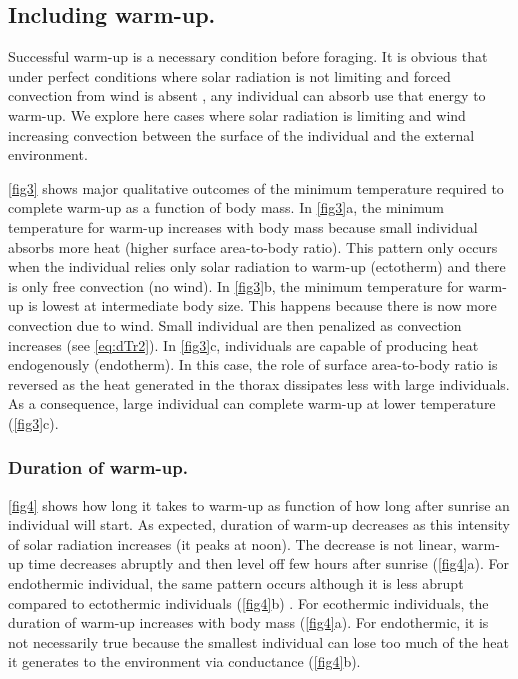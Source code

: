 \subsection*{Including warm-up.}
Successful warm-up is a necessary condition before foraging. 
It is obvious that under perfect conditions where solar radiation is not limiting and forced convection from wind is absent , any individual can absorb use that energy to warm-up.
We explore here cases where solar radiation is limiting and wind increasing convection between the surface of the individual and the external environment.

\cref{fig3} shows major qualitative outcomes of the minimum temperature required to complete warm-up as a function of body mass.
In \cref{fig3}a, the minimum temperature for warm-up increases with body mass because small individual absorbs more heat (higher surface area-to-body ratio).
This pattern only occurs when the individual relies only solar radiation to warm-up (ectotherm) and there is only free convection (no wind).
In \cref{fig3}b, the minimum temperature for warm-up is lowest at intermediate body size.
This happens because there is now more convection due to wind. 
Small individual are then penalized as convection increases (see \cref{eq:dTr2}).
In \cref{fig3}c, individuals are capable of producing heat endogenously (endotherm).
In this case, the role of surface area-to-body ratio is reversed as the heat generated in the thorax dissipates less with large individuals.
As a consequence, large individual can complete warm-up at lower temperature (\cref{fig3}c).

\subsubsection*{Duration of warm-up.}
\cref{fig4} shows how long it takes to warm-up as function of how long after sunrise an individual will start.
As expected, duration of warm-up decreases as this intensity of solar radiation increases (it peaks at noon).
The decrease is not linear, warm-up time decreases abruptly and then level off few hours after sunrise (\cref{fig4}a).
For endothermic individual, the same pattern occurs although it is less abrupt compared to ectothermic individuals (\cref{fig4}b) .
For ecothermic individuals, the duration of warm-up increases with body mass (\cref{fig4}a).
For endothermic, it is not necessarily true because the smallest individual can lose too much of the heat it generates to the environment via conductance (\cref{fig4}b).

